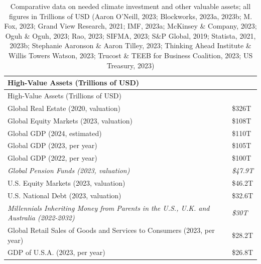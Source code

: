 \documentclass[
  letterpaper,
  DIV=11,
  numbers=noendperiod]{scrartcl}
\begin{document}
\begin{longtable}[]{@{}
  >{\raggedright\arraybackslash}p{}
  >{\raggedright\arraybackslash}p{}@{}}
\caption{Comparative data on needed climate investment and other
valuable assets; all figures in Trillions of USD (Aaron O'Neill, 2023;
Blockworks, 2023a, 2023b; M. Fox, 2023; Grand View Research, 2021; IMF,
2023a; McKinsey \& Company, 2023; Oguh \& Oguh, 2023; Rao, 2023; SIFMA,
2023; S\&P Global, 2019; Statista, 2021, 2023b; Stephanie Aaronson \&
Aaron Tilley, 2023; Thinking Ahead Institute \& Willis Towers Watson,
2023; Trucost \& TEEB for Business Coalition, 2023; US Treasury,
2023)}\tabularnewline
\toprule\noalign{}
\begin{minipage}[b]{\linewidth}\raggedright
High-Value Assets (Trillions of USD)
\end{minipage} & \begin{minipage}[b]{\linewidth}\raggedright
\end{minipage} \\
\midrule\noalign{}
\endfirsthead
\toprule\noalign{}
\begin{minipage}[b]{\linewidth}\raggedright
High-Value Assets (Trillions of USD)
\end{minipage} & \begin{minipage}[b]{\linewidth}\raggedright
\end{minipage} \\
\midrule\noalign{}
\endhead
\bottomrule\noalign{}
\endlastfoot
Global Real Estate (2020, valuation) & \$326T \\
Global Equity Markets (2023, valuation) & \$108T \\
Global GDP (2024, estimated) & \$110T \\
Global GDP (2023, per year) & \$105T \\
Global GDP (2022, per year) & \$100T \\
\emph{Global Pension Funds (2023, valuation)} & \emph{\$47.9T} \\
U.S. Equity Markets (2023, valuation) & \$46.2T \\
U.S. National Debt (2023, valuation) & \$32.6T \\
\emph{Millennials Inheriting Money from Parents in the U.S., U.K. and
Australia (2022-2032)} & \emph{\$30T} \\
Global Retail Sales of Goods and Services to Consumers (2023, per year)
& \$28.2T \\
GDP of U.S.A. (2023, per year) & \$26.8T \\

\end{longtable}
\end{document}
